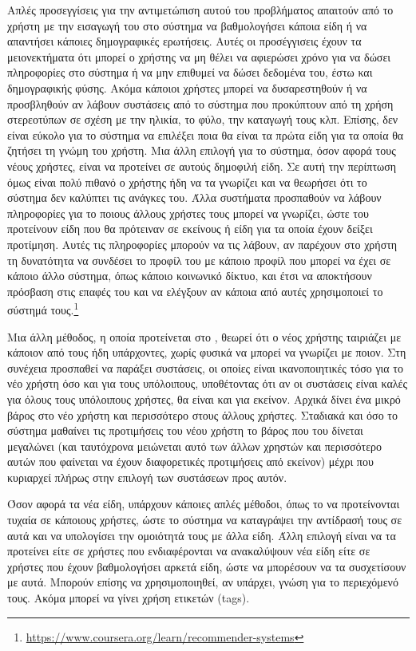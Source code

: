 Απλές προσεγγίσεις για την αντιμετώπιση αυτού του προβλήματος απαιτούν από το χρήστη με την εισαγωγή του στο σύστημα να βαθμολογήσει κάποια είδη ή να απαντήσει κάποιες δημογραφικές ερωτήσεις. Αυτές οι προσέγγισεις έχουν τα μειονεκτήματα ότι μπορεί ο χρήστης να μη θέλει να αφιερώσει χρόνο για να δώσει πληροφορίες στο σύστημα ή να μην επιθυμεί να δώσει δεδομένα του, έστω και δημογραφικής φύσης. Ακόμα κάποιοι χρήστες μπορεί να δυσαρεστηθούν ή να προσβληθούν αν λάβουν συστάσεις από το σύστημα που προκύπτουν από τη χρήση στερεοτύπων σε σχέση με την ηλικία, το φύλο, την καταγωγή τους κλπ.\cite{ricci2011recommender} Επίσης, δεν είναι εύκολο για το σύστημα να επιλέξει ποια θα είναι τα πρώτα είδη για τα οποία θα ζητήσει τη γνώμη του χρήστη. Μια άλλη επιλογή για το σύστημα, όσον αφορά τους νέους χρήστες, είναι να προτείνει σε αυτούς δημοφιλή είδη. Σε αυτή την περίπτωση όμως είναι πολύ πιθανό ο χρήστης ήδη να τα γνωρίζει και να θεωρήσει ότι το σύστημα δεν καλύπτει τις ανάγκες του. Άλλα συστήματα προσπαθούν να λάβουν πληροφορίες για το ποιους άλλους χρήστες τους μπορεί να γνωρίζει, ώστε του προτείνουν είδη που θα πρότειναν σε εκείνους ή είδη για τα οποία έχουν δείξει προτίμηση. Αυτές τις πληροφορίες μπορούν να τις λάβουν, αν παρέχουν στο χρήστη τη δυνατότητα να συνδέσει το προφίλ του με κάποιο προφίλ που μπορεί να έχει σε κάποιο άλλο σύστημα, όπως κάποιο κοινωνικό δίκτυο, και έτσι να αποκτήσουν πρόσβαση στις επαφές του και να ελέγξουν αν κάποια από αυτές χρησιμοποιεί το σύστημά τους.\footnote{\en \url{https://www.coursera.org/learn/recommender-systems}} \par
Μια άλλη μέθοδος, η οποία προτείνεται στο \cite{DBLP:conf/um/Masthoff03}, θεωρεί ότι ο νέος χρήστης ταιριάζει με κάποιον από τους ήδη υπάρχοντες, χωρίς φυσικά να μπορεί να γνωρίζει με ποιον. Στη συνέχεια προσπαθεί να παράξει συστάσεις, οι οποίες είναι ικανοποιητικές τόσο για το νέο χρήστη όσο και για τους υπόλοιπους, υποθέτοντας ότι αν οι συστάσεις είναι καλές για όλους τους υπόλοιπους χρήστες, θα είναι και για εκείνον. Αρχικά δίνει ένα μικρό βάρος στο νέο χρήστη και περισσότερο στους άλλους χρήστες. Σταδιακά και όσο το σύστημα μαθαίνει τις προτιμήσεις του νέου χρήστη το βάρος που του δίνεται μεγαλώνει (και ταυτόχρονα μειώνεται αυτό των άλλων χρηστών και περισσότερο αυτών που φαίνεται να έχουν διαφορετικές προτιμήσεις από εκείνον) μέχρι που κυριαρχεί πλήρως στην επιλογή των συστάσεων προς αυτόν.\par
Όσον αφορά τα νέα είδη, υπάρχουν κάποιες απλές μέθοδοι, όπως το να προτεί\-νονται τυχαία σε κάποιους χρήστες, ώστε το σύστημα να καταγράψει την αντίδρασή τους σε αυτά και να υπολογίσει την ομοιότητά τους με άλλα είδη. Άλλη επιλογή είναι να τα προτείνει είτε σε χρήστες που ενδιαφέρονται να ανακαλύψουν νέα είδη είτε σε χρήστες που έχουν βαθμολογήσει αρκετά είδη, ώστε να μπορέσουν να τα συσχετίσουν με αυτά. Μπορούν επίσης να χρησιμοποιηθεί, αν υπάρχει, γνώση για το περιεχόμενό τους. Ακόμα μπορεί να γίνει χρήση ετικετών ({\en tags}). \par
